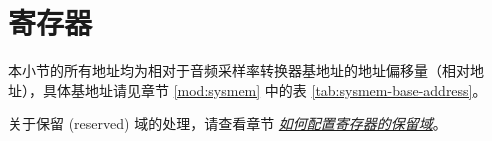 \documentclass[main\_\_CN.tex]{subfiles}
\begin{document}


\newpage
\section{寄存器}

本小节的所有地址均为相对于音频采样率转换器基地址的地址偏移量（相对地址），具体基地址请见章节 \ref{mod:sysmem} \textit{} 中的表 \ref{tab:sysmem-base-address}。

关于保留 (reserved) 域的处理，请查看章节 \hyperref[programming-reserved-field]{\textit{如何配置寄存器的保留域}}。



\end{document}

